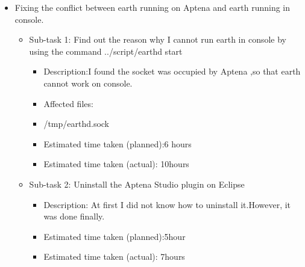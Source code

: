 \documentclass{article}
\begin{document}
 \begin{itemize}
\item Fixing the conflict between earth running on Aptena and earth running in console.
	     \begin{itemize}
	         \item Sub-task 1: Find out the reason why I cannot run earth in console by using the command 
                  ../script/earthd start
	            \begin{itemize}
	              \item Description:I found the socket was occupied by Aptena ,so that earth cannot work on        console. 		
			   	       \item Affected files:\\
                                      \item /tmp/earthd.sock\\
				      \item Estimated time taken (planned):6 hours
				      \item Estimated time taken (actual): 10hours
	                  \end{itemize}
                          \end{itemize}
               \begin{itemize}
	         \item Sub-task 2: Uninstall the Aptena Studio plugin on Eclipse
	            \begin{itemize}
				  \item Description: At first I did not know how to uninstall it.However, it                        was done finally.
			          \item Estimated time taken (planned):5hour
				  \item Estimated time taken (actual): 7hours
                   \end{itemize}
                   \end{itemize}
  \end{itemize}
\end{document}
